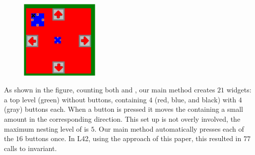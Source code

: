 \begin{figure}
    \centering\includegraphics[width=0.34\textwidth]{GuiImg}\end{figure}
 As shown in the figure, counting both \Q@SafeMovable@s and \Q@Button@s, our main method creates $21$ widgets: a top level (green) \Q@SafeMovable@ without buttons, containing $4$ (red, blue, and black) \Q@SafeMovable@s with
$4$ (gray) buttons each. When a button is pressed it moves the containing \Q@SafeMovable@ a small amount in the corresponding direction.
This set up is not overly involved, the maximum nesting level of \Q@Widget@s is $5$.
Our main method automatically presses each of the $16$ buttons once. In L42, using the approach of this paper, this resulted in $77$ calls to \Q@SafeMovable@s invariant.

